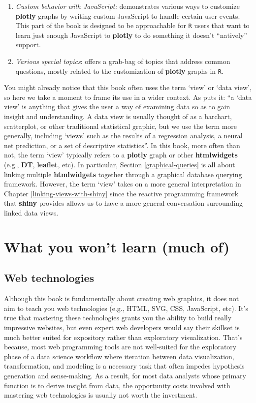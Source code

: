 \documentclass[
  12pt,
]{krantz}
\begin{document}
\begin{enumerate}
\item
  \emph{Custom behavior with JavaScript:} demonstrates various ways to customize \textbf{plotly} graphs by writing custom JavaScript to handle certain user events. This part of the book is designed to be approachable for \texttt{R} users that want to learn just enough JavaScript to \textbf{plotly} to do something it doesn't ``natively'' support.
\item
  \emph{Various special topics}: offers a grab-bag of topics that address common questions, mostly related to the customization of \textbf{plotly} graphs in \texttt{R}.
\end{enumerate}

You might already notice that this book often uses the term `view' or `data view', so here we take a moment to frame its use in a wider context. As \citet{Wills2008} puts it: ``a `data view' is anything that gives the user a way of examining data so as to gain insight and understanding. A data view is usually thought of as a barchart, scatterplot, or other traditional statistical graphic, but we use the term more generally, including `views' such as the results of a regression analysis, a neural net prediction, or a set of descriptive statistics''. In this book, more often than not, the term `view' typically refers to a \textbf{plotly} graph or other \textbf{htmlwidgets} (e.g., \textbf{DT}, \textbf{leaflet}, etc). In particular, Section \ref{graphical-queries} is all about linking multiple \textbf{htmlwidgets} together through a graphical database querying framework. However, the term `view' takes on a more general interpretation in Chapter \ref{linking-views-with-shiny} since the reactive programming framework that \textbf{shiny} provides allows us to have a more general conversation surrounding linked data views.

\hypertarget{what-you-wont-learn-much-of}{%
\section{What you won't learn (much of)}\label{what-you-wont-learn-much-of}}

\hypertarget{web-technologies}{%
\subsection{Web technologies}\label{web-technologies}}

Although this book is fundamentally about creating web graphics, it does not aim to teach you web technologies (e.g., HTML, SVG, CSS, JavaScript, etc). It's true that mastering these technologies grants you the ability to build really impressive websites, but even expert web developers would say their skillset is much better suited for expository rather than exploratory visualization. That's because, most web programming tools are not well-suited for the exploratory phase of a data science workflow where iteration between data visualization, transformation, and modeling is a necessary task that often impedes hypothesis generation and sense-making. As a result, for most data analysts whose primary function is to derive insight from data, the opportunity costs involved with mastering web technologies is usually not worth the investment.
\end{document}
